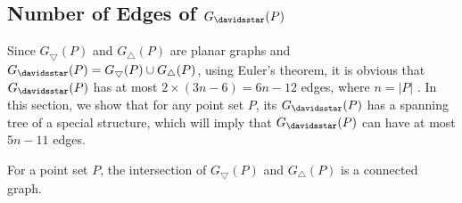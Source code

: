 \subsection{Number of Edges of $G_{\davidsstar}(P)$}
Since $G_\bigtriangledown(P)$ and $G_\bigtriangleup(P)$ are planar graphs and $G_{\davidsstar}(P)=G_\bigtriangledown(P) \cup G_\bigtriangleup(P)$, 
using Euler's theorem, it is obvious that $G_{\davidsstar}(P)$ has at most $2 \times (3n-6) = 6n -12$ edges, where $n=|P|$ \cite{Diestel}. In this 
section, we show that for any point set $P$, its $G_{\davidsstar}(P)$ has a spanning tree of a special structure, which will imply that 
$G_{\davidsstar}(P)$ can have at most $5n-11$ edges.
\begin{lemma}\label{spanningTree}
 For a point set $P$, the intersection of $G_\bigtriangledown(P)$ and $G_\bigtriangleup(P)$ is a connected graph.
\end{lemma}
